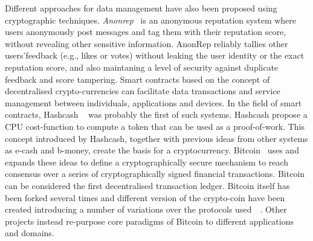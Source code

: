 Different approaches for data management have also been proposed using cryptographic techniques. \emph{Anonrep}~\cite{zhai2016anonrep} is an anonymous reputation system where users anonymously post messages and tag them with their reputation score, without revealing other sensitive information. AnonRep reliably tallies other users’feedback (e.g., likes or votes) without leaking the user identity or the exact reputation score, and also maintaning a level of security against duplicate feedback and score tampering. Smart contracts based on the concept of decentralised crypto-currencies can facilitate data transactions and service management between individuals, applications and devices. In the field of smart contracts, Hashcash ~\cite{back2002hashcash, back2002hashcash2} was probably the first of such systems. Hashcash propose a CPU cost-function to compute a token that can be used as a proof-of-work. This concept introduced by Hashcash, together with previous ideas from other systems as e-cash and b-money, create the basis for a cryptocurrency. Bitcoin~\cite{nakamoto2008bitcoin} uses and expands these ideas to define a cryptographically secure mechanism to reach consensus over a series of cryptographically signed financial transactions. Bitcoin can be considered the first decentralised transaction ledger. Bitcoin itself has been forked several times and different version of the crypto-coin have been created introducing a number of variations over the protocols used~\cite{tschorsch2015bitcoin}~\cite{sprankel2013technical}. Other projects instead re-purpose core paradigms of Bitcoin to different applications and domains.


